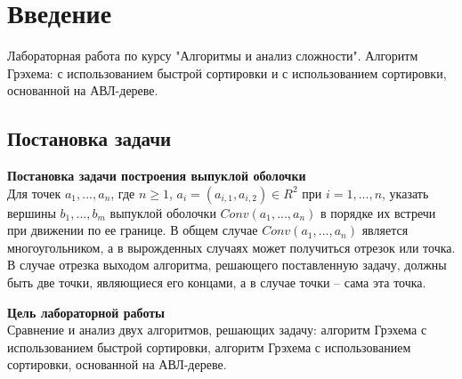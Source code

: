 \section{Введение}
Лабораторная работа по курсу "Алгоритмы и анализ сложности". Алгоритм Грэхема: с использованием быстрой сортировки и с использованием сортировки, основанной на АВЛ-дереве.

\subsection{Постановка задачи}

\noindent \textbf{Постановка задачи построения выпуклой оболочки}\\
\indent Для точек $a_1, ..., a_n$, где $n\geq1$, $a_i=(a_{i,1},a_{i,2})\in R^2$ при $i=1,...,n$, указать вершины $b_1,...,b_m$ выпуклой оболочки $Conv(a_1,...,a_n)$ в порядке их встречи при движении по ее границе. В общем случае $Conv(a_1,...,a_n)$ является многоугольником, а в вырожденных случаях может получиться отрезок или точка. В случае отрезка выходом алгоритма, решающего поставленную задачу, должны быть две точки, являющиеся его концами, а в случае точки -- сама эта точка.

\noindent \textbf{Цель лабораторной работы}\\
\indent Сравнение и анализ двух алгоритмов, решающих задачу: алгоритм Грэхема с использованием быстрой сортировки, алгоритм Грэхема с использованием сортировки, основанной на АВЛ-дереве.

